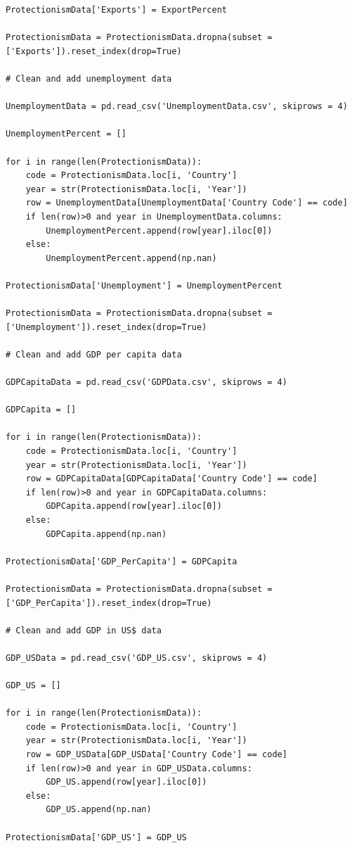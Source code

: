 \documentclass[11pt]{article}
\begin{document}
\begin{lstlisting}
ProtectionismData['Exports'] = ExportPercent

ProtectionismData = ProtectionismData.dropna(subset = ['Exports']).reset_index(drop=True)

# Clean and add unemployment data

UnemploymentData = pd.read_csv('UnemploymentData.csv', skiprows = 4)

UnemploymentPercent = []

for i in range(len(ProtectionismData)):
    code = ProtectionismData.loc[i, 'Country']
    year = str(ProtectionismData.loc[i, 'Year'])
    row = UnemploymentData[UnemploymentData['Country Code'] == code]
    if len(row)>0 and year in UnemploymentData.columns:
        UnemploymentPercent.append(row[year].iloc[0])
    else:
        UnemploymentPercent.append(np.nan)

ProtectionismData['Unemployment'] = UnemploymentPercent

ProtectionismData = ProtectionismData.dropna(subset = ['Unemployment']).reset_index(drop=True)

# Clean and add GDP per capita data

GDPCapitaData = pd.read_csv('GDPData.csv', skiprows = 4)

GDPCapita = []

for i in range(len(ProtectionismData)):
    code = ProtectionismData.loc[i, 'Country']
    year = str(ProtectionismData.loc[i, 'Year'])
    row = GDPCapitaData[GDPCapitaData['Country Code'] == code]
    if len(row)>0 and year in GDPCapitaData.columns:
        GDPCapita.append(row[year].iloc[0])
    else:
        GDPCapita.append(np.nan)

ProtectionismData['GDP_PerCapita'] = GDPCapita

ProtectionismData = ProtectionismData.dropna(subset = ['GDP_PerCapita']).reset_index(drop=True)

# Clean and add GDP in US$ data

GDP_USData = pd.read_csv('GDP_US.csv', skiprows = 4)

GDP_US = []

for i in range(len(ProtectionismData)):
    code = ProtectionismData.loc[i, 'Country']
    year = str(ProtectionismData.loc[i, 'Year'])
    row = GDP_USData[GDP_USData['Country Code'] == code]
    if len(row)>0 and year in GDP_USData.columns:
        GDP_US.append(row[year].iloc[0])
    else:
        GDP_US.append(np.nan)

ProtectionismData['GDP_US'] = GDP_US


\end{lstlisting}
\end{document}
